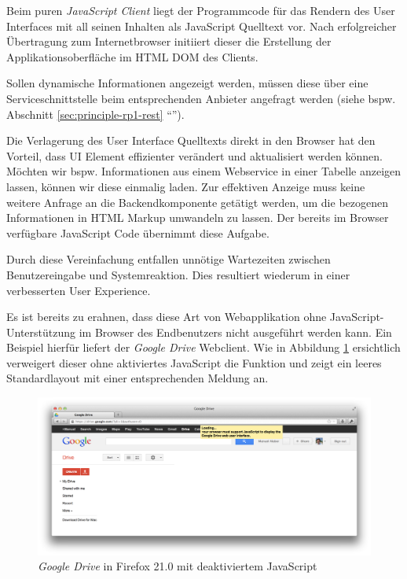 Beim puren \emph{JavaScript Client} liegt der Programmcode für das Rendern des User Interfaces mit all seinen Inhalten als JavaScript Quelltext vor. Nach erfolgreicher Übertragung zum Internetbrowser initiiert dieser die Erstellung der Applikationsoberfläche im HTML \gls{DOM} des Clients.

Sollen dynamische Informationen angezeigt werden, müssen diese über eine Serviceschnittstelle beim entsprechenden Anbieter angefragt werden (siehe bspw. Abschnitt \ref{sec:principle-rp1-rest} ``'').

Die Verlagerung des User Interface Quelltexts direkt in den Browser hat den Vorteil, dass UI Element effizienter verändert und aktualisiert werden können. Möchten wir bspw. Informationen aus einem Webservice in einer Tabelle anzeigen lassen, können wir diese einmalig laden. Zur effektiven Anzeige muss keine weitere Anfrage an die Backendkomponente getätigt werden, um die bezogenen Informationen in HTML Markup umwandeln zu lassen. Der bereits im Browser verfügbare JavaScript Code übernimmt diese Aufgabe.

Durch diese Vereinfachung entfallen unnötige Wartezeiten zwischen Benutzereingabe und Systemreaktion. Dies resultiert wiederum in einer verbesserten User Experience.

Es ist bereits zu erahnen, dass diese Art von Webapplikation ohne JavaScript-Unterstützung im Browser des Endbenutzers nicht ausgeführt werden kann. Ein Beispiel hierfür liefert der \emph{Google Drive} \cite{GoogleDrive} Webclient. Wie in Abbildung \ref{fig:googleDriveNoJs} ersichtlich verweigert dieser ohne aktiviertes JavaScript die Funktion und zeigt ein leeres Standardlayout mit einer entsprechenden Meldung an.

\begin{figure}[H]
	\centering
	\includegraphics[width=12cm]{content/principle-demonstration/images/googledrive-nojs.png}
	\caption{\emph{Google Drive} in Firefox 21.0 mit deaktiviertem JavaScript}
	\label{fig:googleDriveNoJs}
\end{figure}

